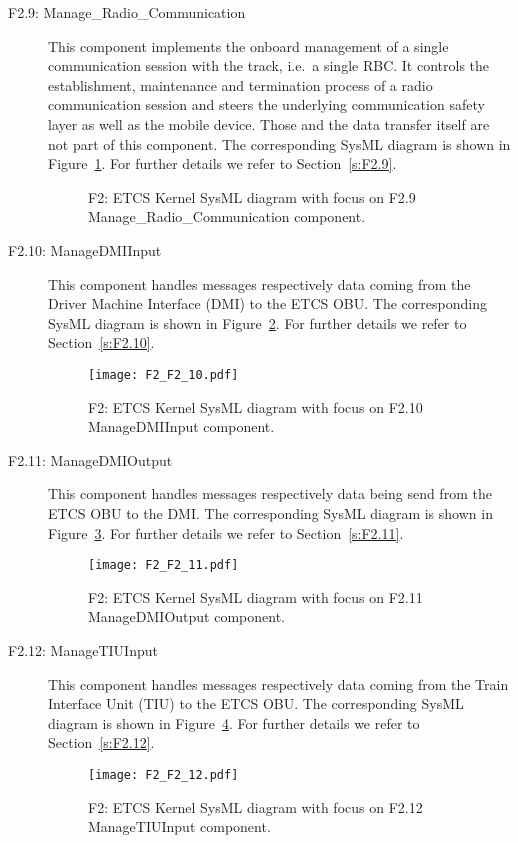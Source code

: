 \begin{description}
\item[F2.9: Manage\_Radio\_Communication] This component implements the onboard management of a single communication session with the track, i.e.~a single RBC. It controls the establishment, maintenance and termination process of a radio communication session and steers the underlying communication safety layer as well as the mobile device. Those and the data transfer itself are not part of this component. The corresponding SysML diagram is shown in Figure~\ref{f:f2.9_overview}. For further details we refer to Section~\ref{s:F2.9}.
\begin{figure}
\center
{}
\caption{F2: ETCS Kernel SysML diagram with focus on F2.9 Manage\_Radio\_Communication component.}\label{f:f2.9_overview}
\end{figure}

\item[F2.10: ManageDMIInput] This component handles messages respectively data coming from the Driver Machine Interface (DMI) to the ETCS OBU. The corresponding SysML diagram is shown in Figure~\ref{f:f2.10_overview}. For further details we refer to Section~\ref{s:F2.10}.
\begin{figure}
\center
\texttt{[image: F2\_F2\_10.pdf]}
\caption{F2: ETCS Kernel SysML diagram with focus on F2.10 ManageDMIInput component.}\label{f:f2.10_overview}
\end{figure}

\item[F2.11: ManageDMIOutput] This component handles messages respectively data being send from the ETCS OBU to the DMI. The corresponding SysML diagram is shown in Figure~\ref{f:f2.11_overview}. For further details we refer to Section~\ref{s:F2.11}.
\begin{figure}
\center
\texttt{[image: F2\_F2\_11.pdf]}
\caption{F2: ETCS Kernel SysML diagram with focus on F2.11 ManageDMIOutput component.}\label{f:f2.11_overview}
\end{figure}

\item[F2.12: ManageTIUInput] This component handles messages respectively data coming from the Train Interface Unit (TIU) to the ETCS OBU. The corresponding SysML diagram is shown in Figure~\ref{f:f2.12_overview}. For further details we refer to Section~\ref{s:F2.12}.
\begin{figure}
\center
\texttt{[image: F2\_F2\_12.pdf]}
\caption{F2: ETCS Kernel SysML diagram with focus on F2.12 ManageTIUInput component.}\label{f:f2.12_overview}
\end{figure}


\end{description}
